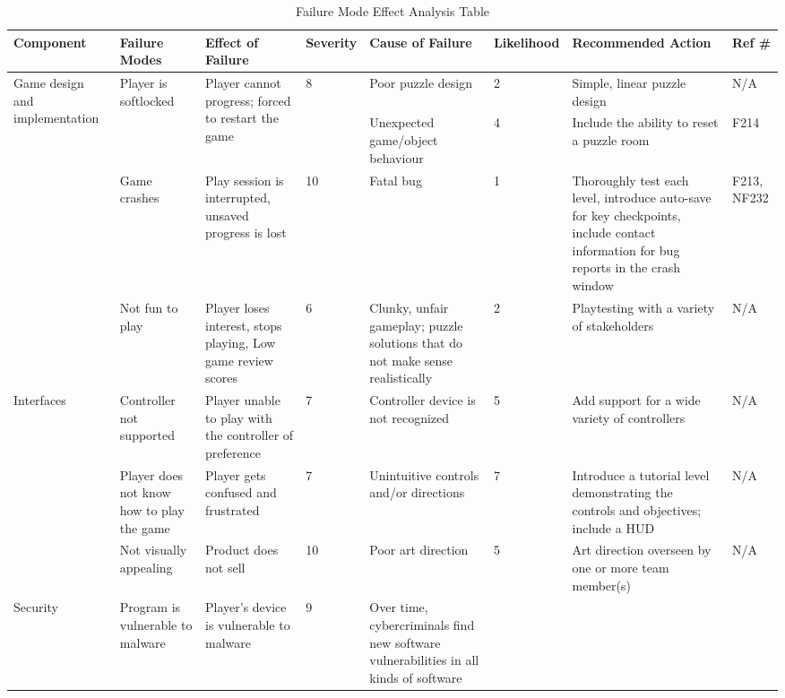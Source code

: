 \documentclass{article}
\begin{document}
\begin{table}[H]
\caption{Failure Mode Effect Analysis Table}
\footnotesize 
\begin{tabular}{|p{2.25cm}|p{1.25cm}|p{2.25cm}|p{1.25cm}|p{2.5cm}|p{1.65cm}|p{2.5cm}|p{0.75cm}|}
\hline
\multicolumn{1}{|l|}{\textbf{Component}} &
  \textbf{Failure Modes} &
  \textbf{Effect of Failure} &
  \textbf{Severity} &
  \textbf{Cause of Failure} &
  \textbf{Likelihood} &
  \textbf{Recommended Action} &
  \textbf{Ref \#} \\ \hline
\multirow{4}{1.25cm}{\centering Game design and implementation} &
  \multirow{2}{1.25cm}{\centering Player is softlocked} &
  \multirow{2}{2.5cm}{\centering Player cannot progress;  forced to restart the game} &
  \multirow{2}{1cm}{8} &
  Poor puzzle design &
  2 &
  Simple, linear puzzle design &
  N/A \\ \cline{5-8} 
 &
   &
   &
   &
  Unexpected game/object behaviour &
  4 &
  Include the ability to reset a puzzle room &
  F214 \\ \cline{2-8} 
 &
  Game crashes &
  Play session is interrupted,  unsaved progress is lost &
  10 &
  Fatal bug &
  1 &
  Thoroughly test each level, introduce auto-save for key checkpoints,  include contact information for bug reports in the crash window &
  F213, NF232 \\ \cline{2-8} 
 &
  Not fun to play &
 Player loses interest, stops playing, Low game review scores &
  6 &
  Clunky, unfair gameplay;  puzzle solutions that do not make sense realistically &
  2 &
  Playtesting with a variety of stakeholders &
  N/A \\ \hline
\multirow{3}{*}{Interfaces} &
  Controller not supported &
Player unable to play with the  controller of preference &
  7 &
  Controller device is not recognized &
  5 &
  Add support for a wide variety of controllers &
  N/A \\ \cline{2-8} 
 &
  Player does not know how to play the game &
  Player gets confused and frustrated &
  7 &
  Unintuitive controls and/or directions &
  7 &
  Introduce a tutorial level demonstrating the controls and objectives;  include a HUD &
  N/A \\ \cline{2-8} 
 &
  Not visually appealing &
  Product does not sell &
  10 &
  Poor art direction &
  5 &
  Art direction overseen by one or more team member(s) &
  N/A \\ \hline
\multicolumn{1}{|l|}{\multirow{2}{*}{Security}} &
  Program is vulnerable to malware &
  Player's device is vulnerable to malware &
  9 &
  Over time, cybercriminals find new  software vulnerabilities in all kinds of software &

\end{tabular}
\end{table}
\end{document}
